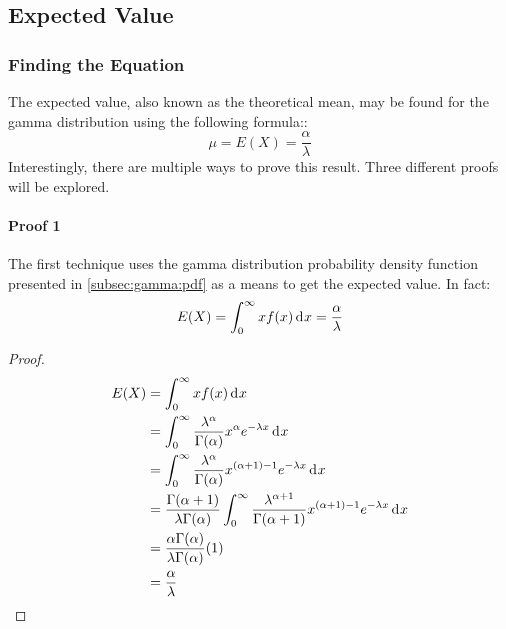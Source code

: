 \documentclass[12pt]{article}
\begin{document}

\pagebreak
\subsection{Expected Value}\label{subsec:gamma:expected}
\subsubsection{Finding the Equation}
The expected value, also known as the theoretical mean, may be found for the gamma distribution using the following
formula::
\begin{equation}
	\mu = E(X) = \frac{\alpha}{\lambda}
\end{equation}
Interestingly, there are multiple ways to prove this result. Three different proofs will be explored.

\paragraph{Proof 1}\label{par:gamma:expected:proof1}
The first technique uses the gamma distribution probability density function presented in \autoref{subsec:gamma:pdf} as
a means to get the expected value. In fact:
\begin{equation}\label{eq:gamma:expected:proof1}
	E(X) = \int^\infty_0 xf(x)\mathop{}\!\mathrm{d^{}}x = \frac{\alpha}{\lambda}
\end{equation}
\begin{proof}
	\begin{equation}
		\begin{split}
			E(X)	&=	\int^\infty_0 xf(x)\mathop{}\!\mathrm{d^{}}x\\
					&=	\int^\infty_0 \frac{\lambda^\alpha}{\Gamma(\alpha)}x^\alpha e^{-\lambda x}\mathop{}\!\mathrm{d^{}}x\\
					&=	\int^\infty_0 \frac{\lambda^\alpha}{\Gamma(\alpha)}x^{(\alpha+1)-1} e^{-\lambda x}\mathop{}\!\mathrm{d^{}}x\\
					&=	\frac{\Gamma(\alpha+1)}{\lambda\Gamma(\alpha)}\int^\infty_0 \frac{\lambda^{\alpha+1}}{\Gamma(\alpha+1)}x^{(\alpha+1)-1} e^{-\lambda x}\mathop{}\!\mathrm{d^{}}x\\
					&=	\frac{\alpha\Gamma(\alpha)}{\lambda\Gamma(\alpha)}(1)\\
					&=	\frac{\alpha}{\lambda}
		\end{split}
	\end{equation}
\end{proof}
\end{document}
